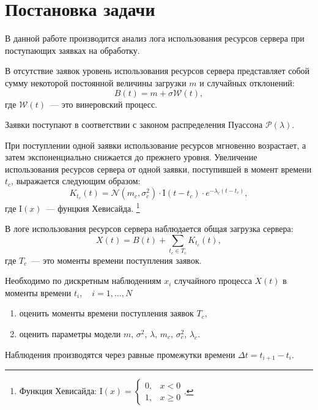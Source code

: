 \documentclass[a4paper,10pt]{article}
\begin{document}

\tableofcontents
\pagebreak


\section{Постановка задачи}
В данной работе производится анализ лога использования ресурсов сервера
при поступающих заявках на обработку.

В отсутствие заявок уровень использования ресурсов сервера представляет собой 
сумму некоторой постоянной величины загрузки $m$ и случайных отклонений:
$$B(t) = m + \sigma \mathcal{W}(t),$$
где $\mathcal{W}(t)$~--- это винеровский процесс. 

Заявки поступают в соответствии с законом распределения Пуассона 
$\mathcal{P}(\lambda)$.

При поступлении одной заявки использование ресурсов мгновенно возрастает,
а затем экспоненциально снижается до прежнего уровня.
Увеличение использования ресурсов сервера от одной заявки, 
поступившей в момент времени $t_c$, выражается следующим образом:
$$K_{t_c}(t) = \mathcal{N}(m_c, \sigma_c^2) \cdot \mathrm{I}(t - t_c) \cdot 
    e^{-\lambda_c(t - t_c)},$$
где $\mathrm{I}(x)$~--- фунцкия Хевисайда.%
\footnote{%
Функция Хевисайда: $\mathrm{I}(x) = \left\{
  \begin{array}{rl}
    0, & x < 0 \\
    1, & x \geqslant 0
  \end{array}\right.$.
}

В логе использования ресурсов сервера наблюдается общая загрузка сервера:
$$X(t) = B(t) + \sum\limits_{t_c \in T_c}K_{t_c}(t),$$
где $T_c$~--- это моменты времени поступления заявок.

Необходимо по дискретным наблюдениям $x_i$ случайного процесса $X(t)$ 
в моменты времени $t_i, \quad i=1,\ldots,N$
\begin{enumerate}
 \item оценить моменты времени поступления заявок $T_c$,
 \item оценить параметры модели $m$, $\sigma^2$, $\lambda$, $m_c$, 
 $\sigma_c^2$, $\lambda_c$.
\end{enumerate}
Наблюдения производятся через равные промежутки времени 
$\Delta t = t_{i+1} - t_i.$
\end{document}
